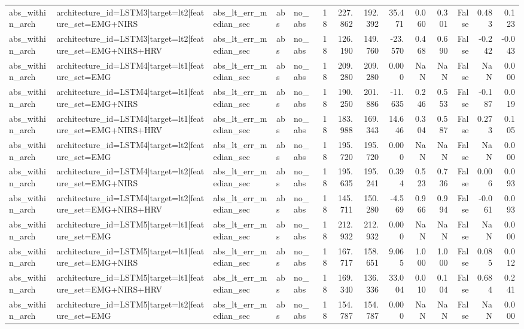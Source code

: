 \begin{table}
\begin{tabular}{lllllrrrrrrrrr}
abs_within_arch & architecture_id=LSTM3|target=lt2|feature_set=EMG+NIRS & abs_lt_err_median_sec & abs & no_abs & 18 & 227.862 & 192.392 & 35.471 & 0.060 & 0.301 & False & 0.483 & 0.123 \\
abs_within_arch & architecture_id=LSTM3|target=lt2|feature_set=EMG+NIRS+HRV & abs_lt_err_median_sec & abs & no_abs & 18 & 126.190 & 149.760 & -23.570 & 0.468 & 0.690 & False & -0.242 & -0.043 \\
abs_within_arch & architecture_id=LSTM4|target=lt1|feature_set=EMG & abs_lt_err_median_sec & abs & no_abs & 18 & 209.280 & 209.280 & 0.000 & NaN & NaN & False & NaN & 0.000 \\
abs_within_arch & architecture_id=LSTM4|target=lt1|feature_set=EMG+NIRS & abs_lt_err_median_sec & abs & no_abs & 18 & 190.250 & 201.886 & -11.635 & 0.246 & 0.553 & False & -0.187 & 0.019 \\
abs_within_arch & architecture_id=LSTM4|target=lt1|feature_set=EMG+NIRS+HRV & abs_lt_err_median_sec & abs & no_abs & 18 & 183.988 & 169.343 & 14.646 & 0.304 & 0.587 & False & 0.273 & 0.105 \\
abs_within_arch & architecture_id=LSTM4|target=lt2|feature_set=EMG & abs_lt_err_median_sec & abs & no_abs & 18 & 195.720 & 195.720 & 0.000 & NaN & NaN & False & NaN & 0.000 \\
abs_within_arch & architecture_id=LSTM4|target=lt2|feature_set=EMG+NIRS & abs_lt_err_median_sec & abs & no_abs & 18 & 195.635 & 195.241 & 0.394 & 0.523 & 0.736 & False & 0.006 & 0.093 \\
abs_within_arch & architecture_id=LSTM4|target=lt2|feature_set=EMG+NIRS+HRV & abs_lt_err_median_sec & abs & no_abs & 18 & 145.711 & 150.280 & -4.569 & 0.966 & 0.994 & False & -0.061 & 0.093 \\
abs_within_arch & architecture_id=LSTM5|target=lt1|feature_set=EMG & abs_lt_err_median_sec & abs & no_abs & 18 & 212.932 & 212.932 & 0.000 & NaN & NaN & False & NaN & 0.000 \\
abs_within_arch & architecture_id=LSTM5|target=lt1|feature_set=EMG+NIRS & abs_lt_err_median_sec & abs & no_abs & 18 & 167.717 & 158.651 & 9.065 & 1.000 & 1.000 & False & 0.085 & 0.012 \\
abs_within_arch & architecture_id=LSTM5|target=lt1|feature_set=EMG+NIRS+HRV & abs_lt_err_median_sec & abs & no_abs & 18 & 169.340 & 136.336 & 33.004 & 0.010 & 0.104 & False & 0.684 & 0.241 \\
abs_within_arch & architecture_id=LSTM5|target=lt2|feature_set=EMG & abs_lt_err_median_sec & abs & no_abs & 18 & 154.787 & 154.787 & 0.000 & NaN & NaN & False & NaN & 0.000 \\

\end{tabular}
\end{table}

